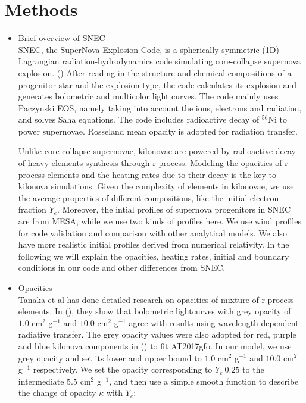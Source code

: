 \documentclass[fleqn,usenatbib]{mnras}
\begin{document}
\section{Methods}
\begin{itemize}
    \item Brief overview of SNEC\\
    SNEC, the SuperNova Explosion Code, is a spherically symmetric (1D) Lagrangian radiation-hydrodynamics code simulating core-collapse supernova explosion. (\cite{morozova2015light}) After reading in the structure and chemical compositions of a progenitor star and the explosion type, the code calculates its explosion and generates bolometric and multicolor light curves. The code mainly uses Paczynski EOS, namely taking into account the ions, electrons and radiation, and solves Saha equations. The code includes radioactive decay of $^{56}$Ni to power supernovae. Rosseland mean opacity is adopted for radiation transfer. 
    
    Unlike core-collapse supernovae, kilonovae are powered by radioactive decay of heavy elements synthesis through r-process. Modeling the opacities of r-process elements and the heating rates due to their decay is the key to kilonova simulations. Given the complexity of elements in kilonovae, we use the average properties of different compositions, like the initial electron fraction $Y_e$. Moreover, the intial profiles of supernova progenitors in SNEC are from MESA, while we use two kinds of profiles here. We use wind profiles for code validation and comparison with other analytical models. We also have more realistic initial profiles derived from numerical relativity. In the following we will explain the opacities, heating rates, initial and boundary conditions in our code and other differences from SNEC.
    

    \item Opacities\\
     Tanaka et al has done detailed research on opacities of mixture of r-process elements. In (\cite{tanaka2018properties}),  they show that bolometric lightcurves with grey opacity of $1.0$ cm$^2$ g$^{-1}$ and $10.0$ cm$^2$ g$^{-1}$ agree with results using wavelength-dependent radiative transfer. The grey opacity values were also adopted for red, purple and blue kilonova components in (\cite{villar2017combined}) to fit AT2017gfo. In our model, we use grey opacity and set its lower and upper bound to $1.0$ cm$^2$ g$^{-1}$ and $10.0$ cm$^2$ g$^{-1}$ respectively. We set the opacity corresponding to $Y_e \ 0.25$ to the intermediate $5.5$ cm$^2$ g$^{-1}$, and then use a simple smooth function to describe the change of opacity $\kappa$ with $Y_e$:
        

\end{itemize}
\end{document}
